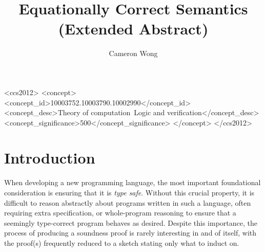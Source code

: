 \documentclass[manuscript,screen,review,sigplan]{acmart}
\begin{document}
\title{Equationally Correct Semantics (Extended Abstract)}

\author{Cameron Wong}

\renewcommand{\shortauthors}{Wong}

\begin{CCSXML}
<ccs2012>
<concept>
<concept_id>10003752.10003790.10002990</concept_id>
<concept_desc>Theory of computation~Logic and verification</concept_desc>
<concept_significance>500</concept_significance>
</concept>
</ccs2012>
\end{CCSXML}


\maketitle

\section{Introduction}

When developing a new programming language, the most important foundational
consideration is ensuring that it is \emph{type safe}. Without this crucial
property, it is difficult to reason abstractly about programs written in such
a language, often requiring extra specification, or whole-program reasoning to
ensure that a seemingly type-correct program behaves as desired. Despite this
importance, the process of producing a soundness proof is rarely interesting in
and of itself, with the proof(s) frequently reduced to a sketch stating only
what to induct on.
\end{document}
